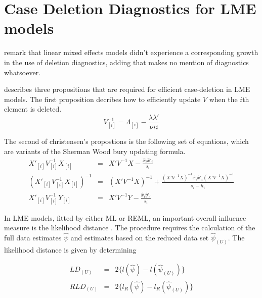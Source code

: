 \section{Case Deletion Diagnostics for LME models}

\citet{HaslettDillane} remark that linear mixed effects models
didn't experience a corresponding growth in the use of deletion
diagnostics, adding that \citet{McCullSearle} makes no mention of
diagnostics whatsoever.

\citet{Christensen} describes three propositions that are required
for efficient case-deletion in LME models. The first proposition
decribes how to efficiently update $V$ when the $i$th element is
deleted.
\begin{equation}
V_{[i]}^{-1} = \Lambda_{[i]} - \frac{\lambda
\lambda\prime}{\nu^{}ii}
\end{equation}


The second of christensen's propostions is the following set of
equations, which are variants of the Sherman Wood bury updating
formula.
\begin{eqnarray}
X'_{[i]}V_{[i]}^{-1}X_{[i]} &=& X' V^{-1}X -
\frac{\hat{x}_{i}\hat{x}'_{i}}{s_{i}}\\
(X'_{[i]}V_{[i]}^{-1}X_{[i]})^{-1} &=& (X' V^{-1}X)^{-1} +
\frac{(X' V^{-1}X)^{-1}\hat{x}_{i}\hat{x}' _{i}
(X' V^{-1}X)^{-1}}{s_{i}- \bar{h}_{i}}\\
X'_{[i]}V_{[i]}^{-1}Y_{[i]} &=& X\prime V^{-1}Y -
\frac{\hat{x}_{i}\hat{y}' _{i}}{s_{i}}
\end{eqnarray}








In LME models, fitted by either ML or REML, an important overall
influence measure is the likelihood distance \citep{cook82}. The
procedure requires the calculation of the full data estimates
$\hat{\psi}$ and estimates based on the reduced data set
$\hat{\psi}_{(U)}$. The likelihood distance is given by
determining


\begin{eqnarray}
LD_{(U)} &=& 2\{l(\hat{\psi}) - l( \hat{\psi}_{(U)}) \}\\
RLD_{(U)} &=& 2\{l_{R}(\hat{\psi}) - l_{R}(\hat{\psi}_{(U)})\}
\end{eqnarray}





